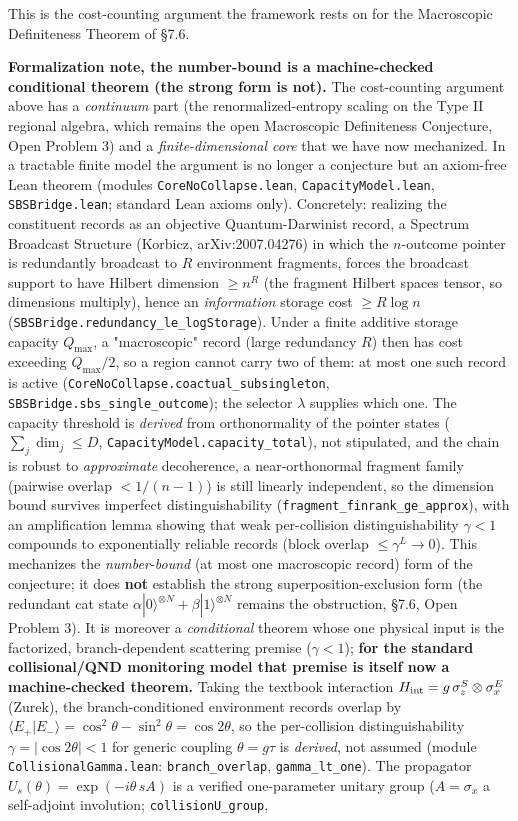\documentclass[11pt,a4paper]{article}
\begin{document}
This is the cost-counting argument the framework rests on for the Macroscopic Definiteness Theorem of §7.6.

\textbf{Formalization note, the number-bound is a machine-checked conditional theorem (the strong form is not).} The cost-counting argument above has a \emph{continuum} part (the renormalized-entropy scaling on the Type II regional algebra, which remains the open Macroscopic Definiteness Conjecture, Open Problem 3) and a \emph{finite-dimensional core} that we have now mechanized. In a tractable finite model the argument is no longer a conjecture but an axiom-free Lean theorem (modules \texttt{CoreNoCollapse.lean}, \texttt{CapacityModel.lean}, \texttt{SBSBridge.lean}; standard Lean axioms only). Concretely: realizing the constituent records as an objective Quantum-Darwinist record, a Spectrum Broadcast Structure (Korbicz, arXiv:2007.04276) in which the $n$-outcome pointer is redundantly broadcast to $R$ environment fragments, forces the broadcast support to have Hilbert dimension $\ge n^{R}$ (the fragment Hilbert spaces tensor, so dimensions multiply), hence an \emph{information} storage cost $\ge R\log n$ (\texttt{SBSBridge.redundancy\_le\_logStorage}). Under a finite additive storage capacity $Q_{\max}$, a "macroscopic" record (large redundancy $R$) then has cost exceeding $Q_{\max}/2$, so a region cannot carry two of them: at most one such record is active (\texttt{CoreNoCollapse.coactual\_subsingleton}, \texttt{SBSBridge.sbs\_single\_outcome}); the selector $\lambda$ supplies which one. The capacity threshold is \emph{derived} from orthonormality of the pointer states ($\sum_j\dim_j\le D$, \texttt{CapacityModel.capacity\_total}), not stipulated, and the chain is robust to \emph{approximate} decoherence, a near-orthonormal fragment family (pairwise overlap $<1/(n-1)$) is still linearly independent, so the dimension bound survives imperfect distinguishability (\texttt{fragment\_finrank\_ge\_approx}), with an amplification lemma showing that weak per-collision distinguishability $\gamma<1$ compounds to exponentially reliable records (block overlap $\le\gamma^{L}\to 0$). This mechanizes the \emph{number-bound} (at most one macroscopic record) form of the conjecture; it does \textbf{not} establish the strong superposition-exclusion form (the redundant cat state $\alpha|0\rangle^{\otimes N}+\beta|1\rangle^{\otimes N}$ remains the obstruction, §7.6, Open Problem 3). It is moreover a \emph{conditional} theorem whose one physical input is the factorized, branch-dependent scattering premise ($\gamma<1$); \textbf{for the standard collisional/QND monitoring model that premise is itself now a machine-checked theorem.} Taking the textbook interaction $H_{\rm int} = g\,\sigma_z^S \otimes \sigma_x^E$ (Zurek), the branch-conditioned environment records overlap by $\langle E_+|E_-\rangle = \cos^2\theta - \sin^2\theta = \cos 2\theta$, so the per-collision distinguishability $\gamma = |\cos 2\theta| < 1$ for generic coupling $\theta = g\tau$ is \emph{derived}, not assumed (module \texttt{CollisionalGamma.lean}: \texttt{branch\_overlap}, \texttt{gamma\_lt\_one}). The propagator $U_s(\theta) = \exp(-i\theta\,sA)$ is a verified one-parameter unitary group ($A = \sigma_x$ a self-adjoint involution; \texttt{collisionU\_group}, 
\end{document}
